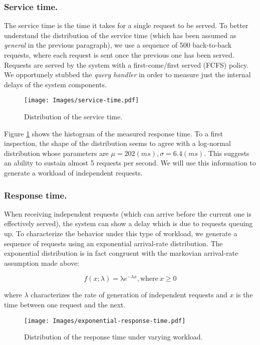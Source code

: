 \subsubsection{Service time.} The service time is the time it takes
for a single request to be served. To better understand the
distribution of the service time (which has been assumed as
\emph{general} in the previous paragraph), we use a sequence of 500
back-to-back requests, where each request is sent once the previous
one has been served. Requests are served by the system with a
first-come/first served (FCFS) policy. We opportunely stubbed the
\emph{query handler} in order to measure just the internal delays of
the system components.

\begin{figure}[t]
\centering
\texttt{[image: Images/service-time.pdf]}
\caption{Distribution of the service time.}
\label{fig:service-time}
\end{figure}


Figure \ref{fig:service-time} shows the histogram of the measured response time.
To a first inspection, the shape of the distribution seems to agree with a log-normal distribution whose parameters are $\mu = 202 (ms), \sigma = 6.4 (ms)$.
This suggests an ability to sustain almost 5 requests per second. We will use this information to generate a workload of independent requests.

\subsubsection{Response time.}
When receiving independent requests (which can arrive before the current one is effectively served), the system can show a delay which is due to requests queuing up. To characterize the behavior
under this type of workload, we generate a sequence of requests using an exponential arrival-rate distribution. The exponential distribution is in fact congruent with the markovian arrival-rate assumption made above:

$$f(x;\lambda) = \mathrm \lambda e^{-\lambda x}, \textrm{where}~ x \geq 0$$

\noindent where $\lambda$ characterizes the rate of generation of independent requests and $x$ is the
time between one request and the next.

\begin{figure}[t]
\centering
\texttt{[image: Images/exponential-response-time.pdf]}
\caption{Distribution of the response time under varying workload.}
\label{fig:response-time}
\end{figure}

